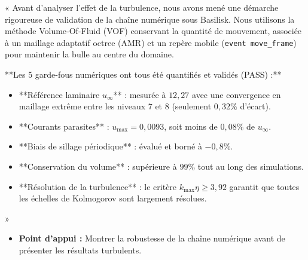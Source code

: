 \documentclass[11pt,a4paper]{article}
\begin{document}
\begin{tcolorbox}[slidebox,title=Diapositive 3 : Méthode Numérique et Chaîne de Validation]
\begin{tcolorbox}[keybox,title=Ce qu'il faut dire à l'oral :]
« Avant d'analyser l'effet de la turbulence, nous avons mené une démarche rigoureuse de validation de la chaîne numérique sous Basilisk. Nous utilisons la méthode Volume-Of-Fluid (VOF) conservant la quantité de mouvement, associée à un maillage adaptatif octree (AMR) et un repère mobile (\texttt{event move\_frame}) pour maintenir la bulle au centre du domaine.

**Les 5 garde-fous numériques ont tous été quantifiés et validés (PASS) :**
\begin{itemize}
    \item **Référence laminaire $u_\infty$** : mesurée à $12{,}27$ avec une convergence en maillage extrême entre les niveaux 7 et 8 (seulement $0{,}32\%$ d'écart).
    \item **Courants parasites** : $u_{\max} = 0{,}0093$, soit moins de $0{,}08\%$ de $u_\infty$.
    \item **Biais de sillage périodique** : évalué et borné à $-0{,}8\%$.
    \item **Conservation du volume** : supérieure à $99\%$ tout au long des simulations.
    \item **Résolution de la turbulence** : le critère $k_{\max}\eta \ge 3{,}92$ garantit que toutes les échelles de Kolmogorov sont largement résolues.
\end{itemize} »
\end{tcolorbox}

\begin{itemize}
    \item \textbf{Point d'appui :} Montrer la robustesse de la chaîne numérique avant de présenter les résultats turbulents.
\end{itemize}
\end{tcolorbox}
\end{document}
